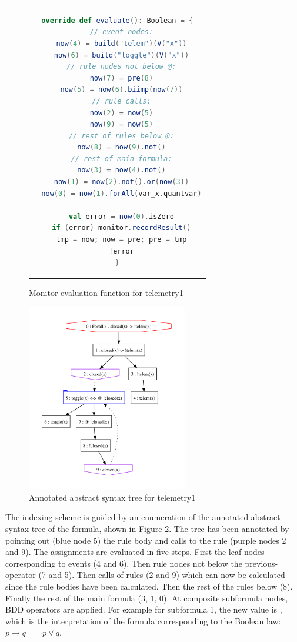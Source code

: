 \begin{figure}
\begin{center}
\begin{tabular}{c}
\begin{lstlisting}[language=scala,basicstyle=\small\sffamily]
override def evaluate(): Boolean = {
  // event nodes:
  now(4) = build("telem")(V("x"))
  now(6) = build("toggle")(V("x"))
  // rule nodes not below @:
  now(7) = pre(8)
  now(5) = now(6).biimp(now(7))
  // rule calls:
  now(2) = now(5)
  now(9) = now(5)
  // rest of rules below @:
  now(8) = now(9).not()
  // rest of main formula:
  now(3) = now(4).not()
  now(1) = now(2).not().or(now(3))
  now(0) = now(1).forAll(var_x.quantvar)

  val error = now(0).isZero
  if (error) monitor.recordResult()
  tmp = now; now = pre; pre = tmp
  !error
}
\end{lstlisting}
\end{tabular}
\end{center}
\caption{Monitor evaluation function for telemetry1}
\label{fig:monitor}
\end{figure}

\begin{figure}
\centering
\includegraphics[width=7cm]{figures/ast.pdf}
\caption{Annotated abstract syntax tree for telemetry1}
\label{fig:ast}
\end{figure}

The indexing scheme is guided by an enumeration of the annotated abstract syntax tree of the formula, shown in Figure \ref{fig:ast}. The tree has been annotated by pointing out (blue node 5) the rule body and calls to the rule (purple nodes 2 and 9).
The assignments are evaluated in five steps. First the leaf nodes corresponding to events (4 and 6). Then rule nodes not below the previous-operator  (7 and 5). Then calls of rules (2 and 9)
which can now be calculated since the rule bodies have been calculated. Then the rest of the rules below   (8). Finally the rest of the main formula (3, 1, 0). At composite subformula nodes, BDD operators are applied. For example for subformula  1, the new  value is , 
which is the interpretation of the formula 
 corresponding to the Boolean law:
$p \rightarrow q = \neg p \vee q$.

